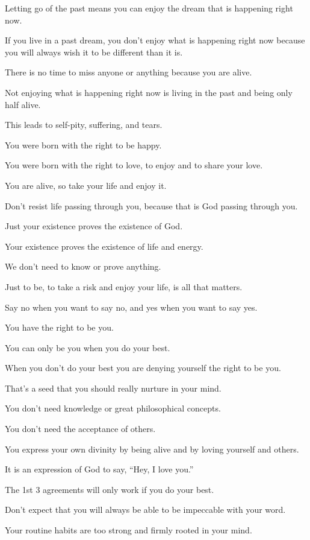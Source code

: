 \documentclass{article}
\numberwithin{equation}{section}
\begin{document}
Letting go of the past means you can enjoy the dream that is happening right now.

%
If you live in a past dream, you don't enjoy what is happening right now because you will always wish it to be different than it is.

There is no time to miss anyone or anything because you are alive.

Not enjoying what is happening right now is living in the past and being only half alive.

This leads to self-pity, suffering, and tears.

%
You were born with the right to be happy.

You were born with the right to love, to enjoy and to share your love.

You are alive, so take your life and enjoy it.

Don't resist life passing through you, because that is God passing through you.

Just your existence proves the existence of God.

Your existence proves the existence of life and energy.

%
We don't need to know or prove anything.

Just to be, to take a risk and enjoy your life, is all that matters.

Say no when you want to say no, and yes when you want to say yes.

You have the right to be you.

You can only be you when you do your best.

When you don't do your best you are denying yourself the right to be you.

That's a seed that you should really nurture in your mind.

You don't need knowledge or great philosophical concepts.

You don't need the acceptance of others.

You express your own divinity by being alive and by loving yourself and others.

It is an expression of God to say, ``Hey, I love you.''

%
The 1st 3 agreements will only work if you do your best.

Don't expect that you will always be able to be impeccable with your word.

Your routine habits are too strong and firmly rooted in your mind.
\end{document}
